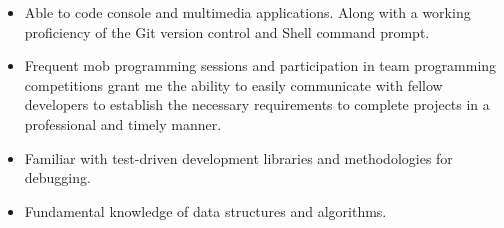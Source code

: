 

\begin{cvparagraph}

\begin{itemize}
  \item {\large Able to code console and multimedia applications. Along with a working proficiency of the Git version control and Shell command prompt.\par}
  \item {\large Frequent mob programming sessions and participation in team programming competitions grant me the ability to easily communicate with fellow developers to establish the necessary requirements to complete projects in a professional and timely manner.\par}
  \item {\large Familiar with test-driven development libraries and methodologies for debugging.\par}
  \item {\large Fundamental knowledge of data structures and algorithms.\par}

\end{itemize}

\end{cvparagraph}